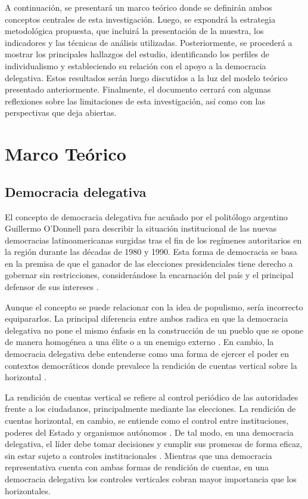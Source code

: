 \documentclass[12pt,twoside]{templates/facsothesis}
\begin{document}
A continuación, se presentará un marco teórico donde se definirán ambos conceptos centrales de esta investigación. Luego, se expondrá la estrategia metodológica propuesta, que incluirá la presentación de la muestra, los indicadores y las técnicas de análisis utilizadas. Posteriormente, se procederá a mostrar los principales hallazgos del estudio, identificando los perfiles de individualismo y estableciendo su relación con el apoyo a la democracia delegativa. Estos resultados serán luego discutidos a la luz del modelo teórico presentado anteriormente. Finalmente, el documento cerrará con algunas reflexiones sobre las limitaciones de esta investigación, así como con las perspectivas que deja abiertas.

\hypertarget{marco-teuxf3rico}{%
\chapter{Marco Teórico}\label{marco-teuxf3rico}}

\hypertarget{democracia-delegativa}{%
\section{Democracia delegativa}\label{democracia-delegativa}}

El concepto de democracia delegativa fue acuñado por el politólogo argentino Guillermo O'Donnell para describir la situación institucional de las nuevas democracias latinoamericanas surgidas tras el fin de los regímenes autoritarios en la región durante las décadas de 1980 y 1990. Esta forma de democracia se basa en la premisa de que el ganador de las elecciones presidenciales tiene derecho a gobernar sin restricciones, considerándose la encarnación del país y el principal defensor de sus intereses \citep{odonnell1994}.

Aunque el concepto se puede relacionar con la idea de populismo, sería incorrecto equipararlos. La principal diferencia entre ambos radica en que la democracia delegativa no pone el mismo énfasis en la construcción de un pueblo que se opone de manera homogénea a una élite o a un enemigo externo \citep{diaz2023, peruzzotti2008}. En cambio, la democracia delegativa debe entenderse como una forma de ejercer el poder en contextos democráticos donde prevalece la rendición de cuentas vertical sobre la horizontal \citep{toppi2018}.

La rendición de cuentas vertical se refiere al control periódico de las autoridades frente a los ciudadanos, principalmente mediante las elecciones. La rendición de cuentas horizontal, en cambio, se entiende como el control entre instituciones, poderes del Estado y organismos autónomos \citep{odonnell1994}. De tal modo, en una democracia delegativa, el líder debe tomar decisiones y cumplir sus promesas de forma eficaz, sin estar sujeto a controles institucionales \citep{toppi2018}. Mientras que una democracia representativa cuenta con ambas formas de rendición de cuentas, en una democracia delegativa los controles verticales cobran mayor importancia que los horizontales.
\end{document}
